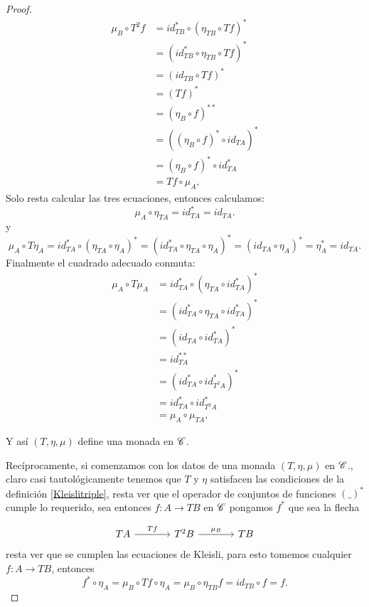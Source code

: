 \documentclass{comunicaciones}
\begin{document}
\begin{proof}
\[
    \begin{aligned}
        \mu_{B}\circ T^{2}f
        &= id_{TB}^{*}\circ (\eta_{TB}\circ Tf)^{*} \\
        &= (id_{TB}^{*}\circ\eta_{TB}\circ Tf)^{*}\\
        &= (id_{TB}\circ Tf)^{*} \\
        &=(Tf)^{*}\\
        &=(\eta_{B}\circ f)^{**}\\
        &=((\eta_{B}\circ f)^{*}\circ id_{TA})^{*}\\
        &=(\eta_{B}\circ f)^{*}\circ id_{TA}^{*}\\
        &= Tf\circ\mu_{A},
    \end{aligned}\]
Solo resta calcular las tres ecuaciones, entonces calculamos: \[\mu_{A}\circ\eta_{TA}=id^{*}_{TA}=id_{TA}.\] y 
\[\mu_{A}\circ T\eta_{A}=id^{*}_{TA}\circ(\eta_{TA}\circ\eta_{A})^{*}=(id^{*}_{TA}\circ\eta_{TA}\circ\eta_{A})^{*}=(id_{TA}\circ\eta_{A})^{*}=\eta_{A}^{*}=id_{TA}.\]
Finalmente el cuadrado adecuado conmuta:
\[
    \begin{aligned}
        \mu_{A}\circ T\mu_{A}
        &= id^{*}_{TA}\circ(\eta_{TA}\circ id^{*}_{TA})^{*} \\
        &= (id^{*}_{TA}\circ\eta_{TA}\circ id^{*}_{TA})^{*}\\
        &= (id_{TA}\circ id_{TA}^{*})^{*} \\
        &=id_{TA}^{**}\\
        &=(id^{*}_{TA}\circ id^{*}_{T^{2}A})^{*}\\
        &=id^{*}_{TA}\circ id_{T^{2}A}^{*}\\
        &=\mu_{A}\circ\mu_{TA},
        \end{aligned}\]

Y así $(T,\eta,\mu)$ define una monada en $\EuScript{C}$.

Recíprocamente, si comenzamos con los datos de una monada $(T,\eta,\mu)$ en $\EuScript{C}$., claro casi tautológicamente tenemos que $T$ y $\eta$ satisfacen las condiciones de la definición
\ref{Kleislitriple}, resta ver que el operador de conjuntos de funciones $(\_)^{*}$ cumple lo requerido, sea entonces $f\colon A\rightarrow TB$ en $\EuScript{C}$ pongamos $f^{*}$ que sea la flecha

\[\begin{tikzcd}[column sep=large, row sep=large]
    TA \arrow[r, "Tf"]  & T^{2}B \arrow[r, "\mu_{B}"] & TB
    \end{tikzcd}\]
 resta ver que se cumplen las ecuaciones de Kleisli, para esto tomemos cualquier $f\colon A\rightarrow TB$, entonces \[f^{*}\circ\eta_{A}=\mu_{B}\circ Tf\circ\eta_{A}=\mu_{B}\circ\eta_{TB} f=id_{TB}\circ f=f.\]


\end{proof}
\end{document}

